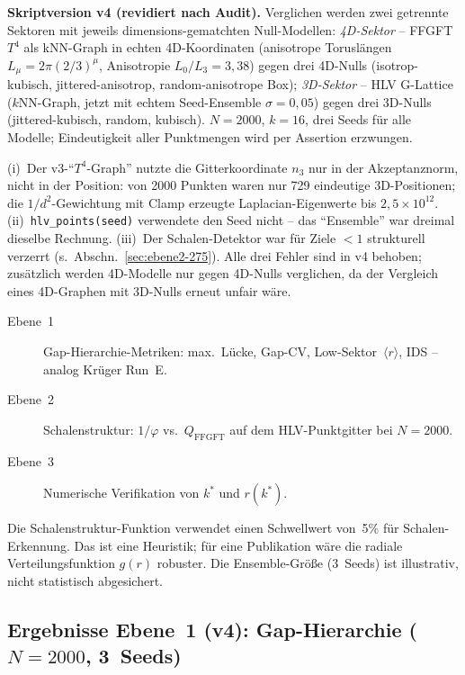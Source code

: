 \textbf{Skriptversion v4 (revidiert nach Audit).} Verglichen werden
zwei getrennte Sektoren mit jeweils dimensions-gematchten Null-Modellen:
\emph{4D-Sektor} -- FFGFT~$T^4$ als kNN-Graph in echten
4D-Koordinaten (anisotrope Toruslängen $L_\mu = 2\pi(2/3)^\mu$,
Anisotropie $L_0/L_3 = 3{,}38$) gegen drei 4D-Nulls (isotrop-kubisch,
jittered-anisotrop, random-anisotrope Box); \emph{3D-Sektor} -- HLV
G-Lattice ($k$NN-Graph, jetzt mit echtem Seed-Ensemble $\sigma=0{,}05$)
gegen drei 3D-Nulls (jittered-kubisch, random, kubisch).
$N=2000$, $k=16$, drei Seeds für alle Modelle; Eindeutigkeit aller
Punktmengen wird per Assertion erzwungen.

\begin{remark}
(i)~Der v3-\enquote{$T^4$-Graph} nutzte die Gitterkoordinate $n_3$ nur
in der Akzeptanznorm, nicht in der Position: von 2000 Punkten waren nur
729 eindeutige 3D-Positionen; die $1/d^2$-Gewichtung mit Clamp erzeugte
Laplacian-Eigenwerte bis $2{,}5\times10^{12}$.
(ii)~\texttt{hlv\_points(seed)} verwendete den Seed nicht -- das
\enquote{Ensemble} war dreimal dieselbe Rechnung.
(iii)~Der Schalen-Detektor war für Ziele $<1$ strukturell verzerrt
(s.\ Abschn.~\ref{sec:ebene2-275}). Alle drei Fehler sind in v4 behoben;
zusätzlich werden 4D-Modelle nur gegen 4D-Nulls verglichen, da der
Vergleich eines 4D-Graphen mit 3D-Nulls erneut unfair wäre.
\end{remark}

\begin{description}
  \item[Ebene~1] Gap-Hierarchie-Metriken: max.\ Lücke, Gap-CV,
    Low-Sektor~$\langle r\rangle$, IDS -- analog Krüger Run~E.
  \item[Ebene~2] Schalenstruktur: $1/\varphi$ vs.\ $Q_\mathrm{FFGFT}$
    auf dem HLV-Punktgitter bei $N=2000$.
  \item[Ebene~3] Numerische Verifikation von $k^*$ und $r(k^*)$.
\end{description}

\begin{remark}
Die Schalenstruktur-Funktion verwendet einen Schwellwert von~5\% für
Schalen-Erkennung. Das ist eine Heuristik; für eine Publikation wäre
die radiale Verteilungsfunktion $g(r)$ robuster. Die Ensemble-Größe
(3~Seeds) ist illustrativ, nicht statistisch abgesichert.
\end{remark}

\subsection{Ergebnisse Ebene~1 (v4): Gap-Hierarchie ($N=2000$, 3~Seeds)}

